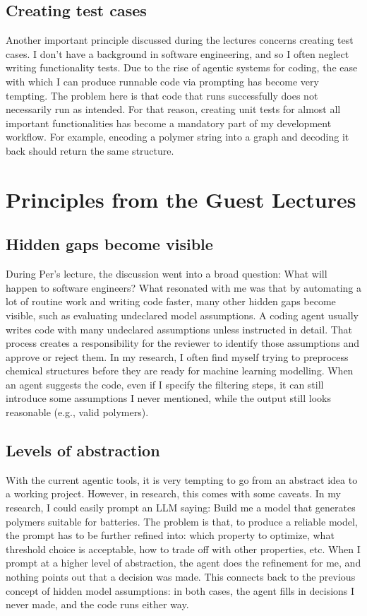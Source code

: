 \documentclass[11pt,a4paper]{article}
\begin{document}
\subsection{Creating test cases}

Another important principle discussed during the lectures concerns creating test cases. I don't have a background in software engineering, and so I often neglect writing functionality tests. Due to the rise of agentic systems for coding, the ease with which I can produce runnable code via prompting has become very tempting. The problem here is that code that runs successfully does not necessarily run as intended. For that reason, creating unit tests for almost all important functionalities has become a mandatory part of my development workflow. For example, encoding a polymer string into a graph and decoding it back should return the same structure.

\section{Principles from the Guest Lectures}

\subsection{Hidden gaps become visible}

During Per's lecture, the discussion went into a broad question: What will happen to software engineers? What resonated with me was that by automating a lot of routine work and writing code faster, many other hidden gaps become visible, such as evaluating undeclared model assumptions. A coding agent usually writes code with many undeclared assumptions unless instructed in detail. That process creates a responsibility for the reviewer to identify those assumptions and approve or reject them. In my research, I often find myself trying to preprocess chemical structures before they are ready for machine learning modelling. When an agent suggests the code, even if I specify the filtering steps, it can still introduce some assumptions I never mentioned, while the output still looks reasonable (e.g., valid polymers).

\subsection{Levels of abstraction}

With the current agentic tools, it is very tempting to go from an abstract idea to a working project. However, in research, this comes with some caveats. In my research, I could easily prompt an LLM saying: Build me a model that generates polymers suitable for batteries. The problem is that, to produce a reliable model, the prompt has to be further refined into: which property to optimize, what threshold choice is acceptable, how to trade off with other properties, etc. When I prompt at a higher level of abstraction, the agent does the refinement for me, and nothing points out that a decision was made. This connects back to the previous concept of hidden model assumptions: in both cases, the agent fills in decisions I never made, and the code runs either way.
\end{document}

